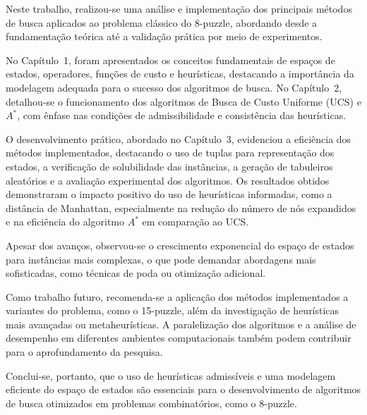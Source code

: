   
Neste trabalho, realizou-se uma análise e implementação dos principais métodos de busca aplicados ao problema clássico do 8-puzzle, abordando desde a fundamentação teórica até a validação prática por meio de experimentos.  
  
No Capítulo~1, foram apresentados os conceitos fundamentais de espaços de estados, operadores, funções de custo e heurísticas, destacando a importância da modelagem adequada para o sucesso dos algoritmos de busca. No Capítulo~2, detalhou-se o funcionamento dos algoritmos de Busca de Custo Uniforme (UCS) e $A^*$, com ênfase nas condições de admissibilidade e consistência das heurísticas.  
  
O desenvolvimento prático, abordado no Capítulo~3, evidenciou a eficiência dos métodos implementados, destacando o uso de tuplas para representação dos estados, a verificação de solubilidade das instâncias, a geração de tabuleiros aleatórios e a avaliação experimental dos algoritmos. Os resultados obtidos demonstraram o impacto positivo do uso de heurísticas informadas, como a distância de Manhattan, especialmente na redução do número de nós expandidos e na eficiência do algoritmo $A^*$ em comparação ao UCS.  
  
Apesar dos avanços, observou-se o crescimento exponencial do espaço de estados para instâncias mais complexas, o que pode demandar abordagens mais sofisticadas, como técnicas de poda ou otimização adicional.  
  
Como trabalho futuro, recomenda-se a aplicação dos métodos implementados a variantes do problema, como o 15-puzzle, além da investigação de heurísticas mais avançadas ou metaheurísticas. A paralelização dos algoritmos e a análise de desempenho em diferentes ambientes computacionais também podem contribuir para o aprofundamento da pesquisa.  
  
Conclui-se, portanto, que o uso de heurísticas admissíveis e uma modelagem eficiente do espaço de estados são essenciais para o desenvolvimento de algoritmos de busca otimizados em problemas combinatórios, como o 8-puzzle.  
  
